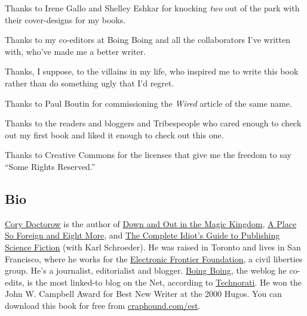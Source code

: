 Thanks to Irene Gallo and Shelley Eshkar for knocking \emph{two}
out of the park with their cover-designs for my books.

Thanks to my co-editors at Boing Boing and all the collaborators
I’ve written with, who’ve made me a better writer.

Thanks, I suppose, to the villains in my life, who inspired me to
write this book rather than do something ugly that I’d regret.

Thanks to Paul Boutin for commissioning the \emph{Wired} article of
the same name.

Thanks to the readers and bloggers and Tribespeople who cared
enough to check out my first book and liked it enough to check out
this one.

Thanks to Creative Commons for the licenses that give me the
freedom to say “Some Rights Reserved.”

\subsection{Bio}

\href{http://craphound.com/}{Cory Doctorow} is the author of
\href{http://craphound.com/down}{Down and Out in the Magic Kingdom},
\href{http://craphound.com/place}{A Place So Foreign and Eight More},
and
\href{http://craphound.com/nonfic/cigpsf.html}{The Complete Idiot’s Guide to Publishing Science Fiction}
(with Karl Schroeder). He was raised in Toronto and lives in San
Francisco, where he works for the
\href{http://www.eff.org/}{Electronic Frontier Foundation}, a civil
liberties group. He’s a journalist, editorialist and blogger.
\href{http://boingboing.net/}{Boing Boing}, the weblog he co-edits,
is the most linked-to blog on the Net, according to
\href{http://technorati.com/}{Technorati}. He won the John W.
Campbell Award for Best New Writer at the 2000 Hugos. You can
download this book for free from
\href{http://craphound.com/est}{craphound.com/est}.

